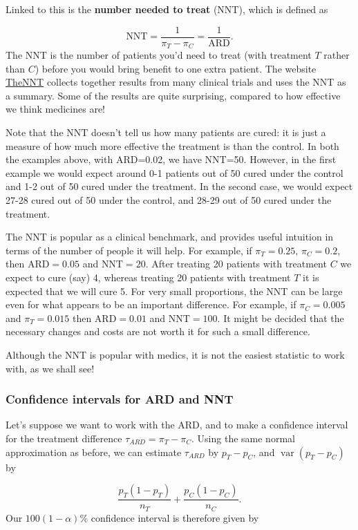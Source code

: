 \documentclass[
  openany]{book}
\theoremstyle{definition}
\theoremstyle{definition}
\theoremstyle{definition}
\theoremstyle{definition}
\theoremstyle{remark}
\begin{document}
Linked to this is the \textbf{number needed to treat} (NNT), which is defined as

\[ \text{NNT} = \frac{1}{\pi_T - \pi_C} = \frac{1}{\text{ARD}}. \]
The NNT is the number of patients you'd need to treat (with treatment \(T\) rather than \(C\)) before you would bring benefit to one extra patient. The website \href{https://thennt.com/}{TheNNT} collects together results from many clinical trials and uses the NNT as a summary. Some of the results are quite surprising, compared to how effective we think medicines are!

Note that the NNT doesn't tell us how many patients are cured: it is just a measure of how much more effective the treatment is than the control. In both the examples above, with ARD=0.02, we have NNT=50. However, in the first example we would expect around 0-1 patients out of 50 cured under the control and 1-2 out of 50 cured under the treatment. In the second case, we would expect 27-28 cured out of 50 under the control, and 28-29 out of 50 cured under the treatment.

The NNT is popular as a clinical benchmark, and provides useful intuition in terms of the number of people it will help. For example, if \(\pi_T = 0.25,\,\pi_C=0.2\), then \(\text{ARD} = 0.05\) and \(\text{NNT} = 20.\) After treating 20 patients with treatment \(C\) we expect to cure (say) 4, whereas treating 20 patients with treatment \(T\) it is expected that we will cure 5. For very small proportions, the NNT can be large even for what appears to be an important difference. For example, if \(\pi_C=0.005\) and \(\pi_T = 0.015\) then \(\text{ARD}=0.01\) and \(\text{NNT}=100\). It might be decided that the necessary changes and costs are not worth it for such a small difference.

Although the NNT is popular with medics, it is not the easiest statistic to work with, as we shall see!

\subsubsection{Confidence intervals for ARD and NNT}\label{confint-ardnnt}

Let's suppose we want to work with the ARD, and to make a confidence interval for the treatment difference \(\tau_{ARD} = \pi_T - \pi_C\). Using the same normal approximation as before, we can estimate \(\tau_{ARD}\) by \(p_T - p_C\), and \(\operatorname{var}\left(p_T - p_C\right)\) by

\[ \frac{p_T\left(1-p_T\right)}{n_T} + \frac{p_C\left(1-p_C\right)}{n_C}.\]
Our \(100\left(1-\alpha\right)\)\% confidence interval is therefore given by
\end{document}
